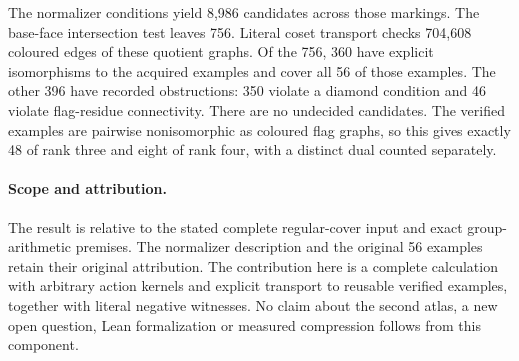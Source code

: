 \documentclass[11pt,a4paper]{article}
\begin{document}
The normalizer conditions yield 8,986 candidates across those markings.
The base-face intersection test leaves 756. Literal coset transport
checks 704,608 coloured edges of these quotient graphs. Of the 756,
360 have explicit isomorphisms to the acquired examples and cover all
56 of those examples. The other 396 have recorded obstructions:
350 violate a diamond condition and 46 violate flag-residue connectivity.
There are no undecided candidates. The verified examples are pairwise
nonisomorphic as coloured flag graphs, so this gives exactly 48 of rank
three and eight of rank four, with a distinct dual counted separately.

\paragraph{Scope and attribution.}
The result is relative to the stated complete regular-cover input and
exact group-arithmetic premises. The normalizer description and the
original 56 examples retain their original attribution. The contribution
here is a complete calculation with arbitrary action kernels and explicit
transport to reusable verified examples, together with literal negative
witnesses. No claim about the second atlas, a new open question, Lean
formalization or measured compression follows from this component.
\end{document}
